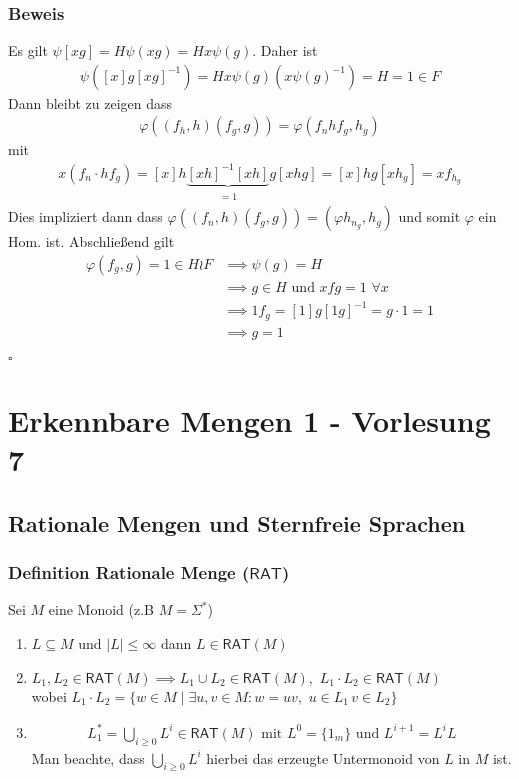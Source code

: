 \documentclass[12pt, german]{article}
\newcommand{\sigstern}{\Sigma^\ast}
\newcommand{\rat}{\mathsf{RAT}}
\newcommand{\bewiesen}{
	
	\begin{flushright}
		$\square$  \\
\end{flushright}}
\begin{document}
	\subsubsection{Beweis}
	Es gilt $\psi[xg] = H\psi(xg) = Hx\psi(g)$. Daher ist
	\begin{align*}
		\psi([x]g[xg]^{-1}) = Hx\psi(g)(x\psi(g)^{-1}) = H = 1 \in F
	\end{align*}
	Dann bleibt zu zeigen dass 
	\begin{align*}
		\varphi((f_h, h)(f_g, g)) = \varphi(f_nhf_g, h_g) 
	\end{align*}
	mit 
	\begin{align*}
		x(f_n \cdot hf_g) = [x]h\underbrace{[xh]^{-1}[xh]}_{\substack{=1}}g[xhg] = [x]hg[xh_g] = xf_{h_g}
	\end{align*}
	Dies impliziert dann dass $\varphi((f_n, h)(f_g,g)) = (\varphi h_{n_g}, h_g)$ und somit $\varphi$ ein Hom. ist. 
	Abschließend gilt 
	\begin{align*}
		\varphi(f_g, g) = 1 \in H \wr F &\implies \psi(g) = H \\
		&\implies g \in H \text{ und } xfg = 1 \, \, \forall x \\ 
		&\implies 1f_g = [1]g[1g]^{-1} = g \cdot 1 = 1 \\
		&\implies g = 1
	\end{align*}
	\bewiesen
	
	\section{Erkennbare Mengen 1 - Vorlesung 7}
	\subsection{Rationale Mengen und Sternfreie Sprachen}
	\subsubsection{Definition Rationale Menge ($\rat$)}
	Sei $M$ eine Monoid (z.B $M = \sigstern$) 
	\begin{enumerate}[label=\arabic*)]
		\item $L \subseteq M $ und $ |L| \leq \infty$ dann $L \in \rat(M)$
		\item $L_1, L_2 \in \rat(M) \implies L_1 \cup L_2 \in \rat(M), \, \, L_1 \cdot L_2 \in \rat(M)$ \\ 
		wobei $ L_1 \cdot L_2 = \{w \in M \mid \exists u,v \in M : w = uv, \, \, u \in L_1 \, v \in L_2\}$
		\item
		\begin{align*}
			L_1^\ast = \bigcup_{i \geq 0} L^i \in \rat(M) \text{ mit } L^0=\{1_m\} \text{ und } L^{i+1} = L^iL
		\end{align*}
		Man beachte, dass $\bigcup_{i \geq 0} L^i $ hierbei das erzeugte Untermonoid von $L$ in $M$ ist.
	\end{enumerate}
	
\end{document}
